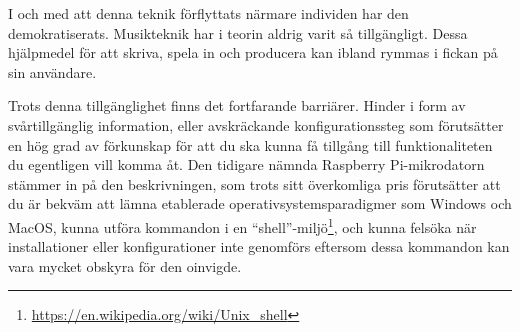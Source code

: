 \documentclass{article}
\begin{document}
I och med att denna teknik förflyttats närmare individen har den demokratiserats. Musikteknik har i teorin
aldrig varit så tillgängligt. Dessa hjälpmedel för att skriva, spela in och producera kan ibland rymmas i
fickan på sin användare.

Trots denna tillgänglighet finns det fortfarande barriärer. Hinder i form av svårtillgänglig information,
eller avskräckande konfigurationssteg som förutsätter en hög grad av förkunskap för att du ska kunna få
tillgång till funktionaliteten du egentligen vill komma åt. Den tidigare nämnda Raspberry Pi-mikrodatorn
stämmer in på den beskrivningen, som trots sitt överkomliga pris förutsätter att du är bekväm att lämna
etablerade operativsystemsparadigmer som Windows och MacOS, kunna utföra kommandon i en
``shell''-miljö\footnote{\url{https://en.wikipedia.org/wiki/Unix\_shell}}, och kunna felsöka när
installationer eller konfigurationer inte genomförs
eftersom dessa kommandon kan vara mycket obskyra för den oinvigde.
	
\end{document}
